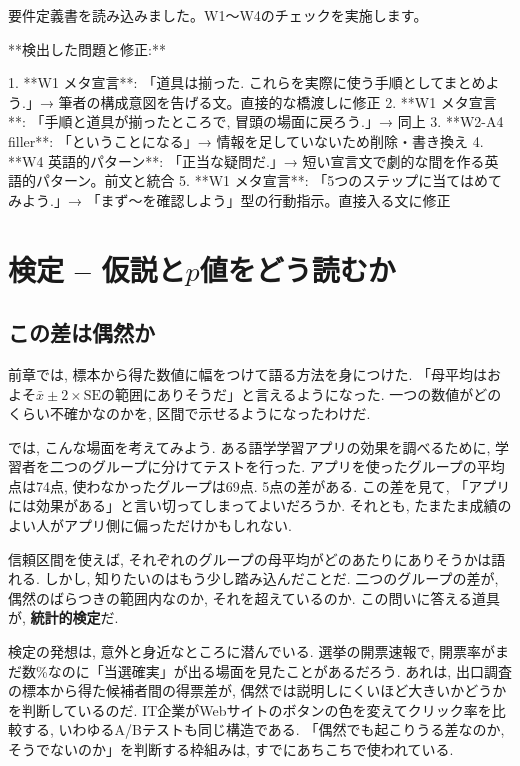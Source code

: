 ﻿要件定義書を読み込みました。W1〜W4のチェックを実施します。

**検出した問題と修正:**

1. **W1 メタ宣言**: 「道具は揃った. これらを実際に使う手順としてまとめよう.」→ 筆者の構成意図を告げる文。直接的な橋渡しに修正
2. **W1 メタ宣言**: 「手順と道具が揃ったところで, 冒頭の場面に戻ろう.」→ 同上
3. **W2-A4 filler**: 「ということになる」→ 情報を足していないため削除・書き換え
4. **W4 英語的パターン**: 「正当な疑問だ.」→ 短い宣言文で劇的な間を作る英語的パターン。前文と統合
5. **W1 メタ宣言**: 「5つのステップに当てはめてみよう.」→ 「まず〜を確認しよう」型の行動指示。直接入る文に修正

\section{検定 -- 仮説と$p$値をどう読むか}

  \subsection{この差は偶然か}

    前章では, 標本から得た数値に幅をつけて語る方法を身につけた.
    「母平均はおよそ$\bar{x} \pm 2 \times \mathrm{SE}$の範囲にありそうだ」と言えるようになった.
    一つの数値がどのくらい不確かなのかを, 区間で示せるようになったわけだ.

    では, こんな場面を考えてみよう.
    ある語学学習アプリの効果を調べるために, 学習者を二つのグループに分けてテストを行った.
    アプリを使ったグループの平均点は74点, 使わなかったグループは69点.
    5点の差がある.
    この差を見て, 「アプリには効果がある」と言い切ってしまってよいだろうか.
    それとも, たまたま成績のよい人がアプリ側に偏っただけかもしれない.

    信頼区間を使えば, それぞれのグループの母平均がどのあたりにありそうかは語れる.
    しかし, 知りたいのはもう少し踏み込んだことだ.
    二つのグループの差が, 偶然のばらつきの範囲内なのか, それを超えているのか.
    この問いに答える道具が, \textbf{統計的検定}だ.

    検定の発想は, 意外と身近なところに潜んでいる.
    選挙の開票速報で, 開票率がまだ数\%なのに「当選確実」が出る場面を見たことがあるだろう.
    あれは, 出口調査の標本から得た候補者間の得票差が, 偶然では説明しにくいほど大きいかどうかを判断しているのだ.
    IT企業がWebサイトのボタンの色を変えてクリック率を比較する, いわゆるA/Bテストも同じ構造である.
    「偶然でも起こりうる差なのか, そうでないのか」を判断する枠組みは, すでにあちこちで使われている.

